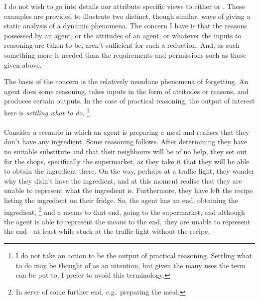 \documentclass[10pt]{article}
\begin{document}
I do not wish to go into details nor attribute specific views to either \citeauthor{Lord:2017aa} or \citeauthor{Broome:2013aa}.
These examples are provided to illustrate two distinct, though similar, ways of giving a static analysis of a dynamic phenomena.
The concern I have is that the reasons possessed by an agent, or the attitudes of an agent, or whatever the inputs to reasoning are taken to be, aren't sufficient for such a reduction.
And, as such something more is needed than the requirements and permissions such as those given above.

The basis of the concern is the relatively mundane phenomena of forgetting.
An agent does some reasoning, takes inputs in the form of attitudes or reasons, and produces certain outputs.
In the case of practical reasoning, the output of interest here is \emph{settling what to do}.\nolinebreak
\footnote{I do not take an action to be the output of practical reasoning.
  Settling what to do may be thought of as an intention, but given the many uses the term can be put to, I prefer to avoid this terminology.}

\paragraph*{}

Consider a scenario in which an agent is preparing a meal and realises that they don't have any ingredient.
Some reasoning follows.
After determining they have no suitable substitute and that their neighbours will be of no help, they set out for the shops, specifically the supermarket, as they take it that they will be able to obtain the ingredient there.
On the way, perhaps at a traffic light, they wonder why they didn't have the ingredient, and at this moment realise that they are unable to represent what the ingredient is.
Furthermore, they have left the recipe listing the ingredient on their fridge.
So, the agent has an end, obtaining the ingredient,\nolinebreak
\footnote{In serve of some further end, e.g.\ preparing the meal.}
and a means to that end, going to the supermarket, and although the agent is able to represent the means to the end, they are unable to represent the end---at least while stuck at the traffic light without the recipe.
\end{document}
